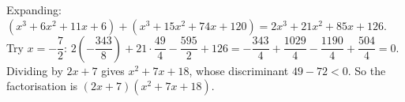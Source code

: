 Expanding: $(x^3+6x^2+11x+6)+(x^3+15x^2+74x+120)=2x^3+21x^2+85x+126$. Try $x=-\dfrac72$: $2\left(-\dfrac{343}8\right)+21\cdot\dfrac{49}4-\dfrac{595}2+126=-\dfrac{343}4+\dfrac{1029}4-\dfrac{1190}4+\dfrac{504}4=0$. Dividing by $2x+7$ gives $x^2+7x+18$, whose discriminant $49-72<0$. So the factorisation is $\boxed{(2x+7)(x^2+7x+18)}$.

